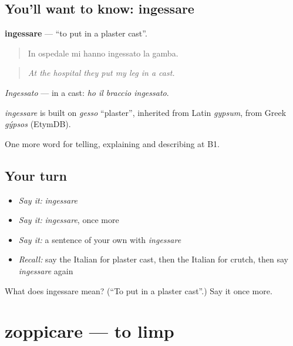 \subsection*{You'll want to know: ingessare}
\textbf{ingessare} — \textquotedblleft{}to put in a plaster cast\textquotedblright{}.

\begin{quote}
In ospedale mi hanno ingessato la gamba.
\end{quote}

\begin{quote}
\emph{At the hospital they put my leg in a cast.}
\end{quote}

\emph{Ingessato} — in a cast: \emph{ho il braccio ingessato}.

\begin{cousinweb}
\emph{ingessare} is built on \emph{gesso} \textquotedblleft{}plaster\textquotedblright{}, inherited from Latin \emph{gypsum}, from Greek \emph{gýpsos} (EtymDB).
\end{cousinweb}

\begin{grammarlens}[title={What you've built}]
One more word for telling, explaining and describing at B1.
\end{grammarlens}

\subsection*{Your turn}
\begin{itemize}
\raggedright
  \item \emph{Say it:} \emph{ingessare}
  \item \emph{Say it:} \emph{ingessare}, once more
  \item \emph{Say it:} a sentence of your own with \emph{ingessare}
  \item \emph{Recall:} say the Italian for plaster cast, then the Italian for crutch, then say \emph{ingessare} again
\end{itemize}

\begin{tcolorbox}[breakable,colback=teal!4,colframe=teal!35!black,title={Before you move on}]
What does ingessare mean? (\textquotedblleft{}To put in a plaster cast\textquotedblright{}.) Say it once more.
\end{tcolorbox}
\section[zoppicare]{zoppicare — to limp}

